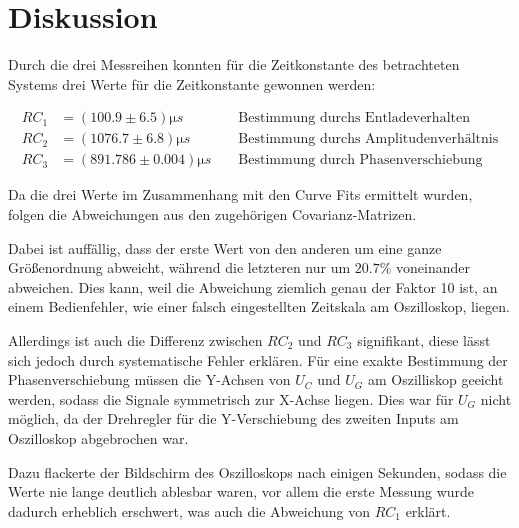 \section{Diskussion}
\label{sec:Diskussion}
Durch die drei Messreihen konnten für die Zeitkonstante des betrachteten Systems drei
Werte für die Zeitkonstante gewonnen werden:

\begin{align}
	RC_1 &= (100.9 \pm 6.5) \si{\micro s} &
	\label{eqn:RC_1}
	     &\text{ Bestimmung durchs Entladeverhalten}
	\\
	RC_2 &= (1076.7 \pm 6.8) \si{\micro s} &
	\label{eqn:RC_2}
	     &\text{ Bestimmung durchs Amplitudenverhältnis}
	\\
	RC_3 &= (891.786 \pm 0.004) \si{\micro s} &
	\label{eqn:RC_3}
	     &\text{ Bestimmung durch Phasenverschiebung}
\end{align}

Da die drei Werte im Zusammenhang mit den Curve Fits ermittelt wurden, folgen die Abweichungen aus den 
zugehörigen
Covarianz-Matrizen.

Dabei ist auffällig, dass der erste Wert von den anderen um eine ganze Größenordnung
abweicht, während die letzteren nur um $20.7\%$ voneinander abweichen. Dies kann, weil die 
Abweichung ziemlich genau der Faktor 10 ist, an einem Bedienfehler, wie einer falsch eingestellten
Zeitskala am Oszilloskop, liegen.

Allerdings ist auch die Differenz zwischen $RC_2$ und $RC_3$ signifikant, diese lässt sich jedoch
durch systematische Fehler erklären. Für eine exakte Bestimmung der Phasenverschiebung müssen
die Y-Achsen von $U_C$ und $U_G$ am Oszilliskop geeicht werden, sodass die Signale symmetrisch
zur X-Achse liegen. Dies war für $U_G$ nicht möglich, da der Drehregler für
die Y-Verschiebung des zweiten Inputs am Oszilloskop abgebrochen war.

Dazu flackerte der Bildschirm des Oszilloskops nach einigen Sekunden, sodass die Werte nie lange 
deutlich ablesbar waren, vor allem die erste Messung wurde dadurch erheblich erschwert, 
was auch die Abweichung von $RC_1$ erklärt.
